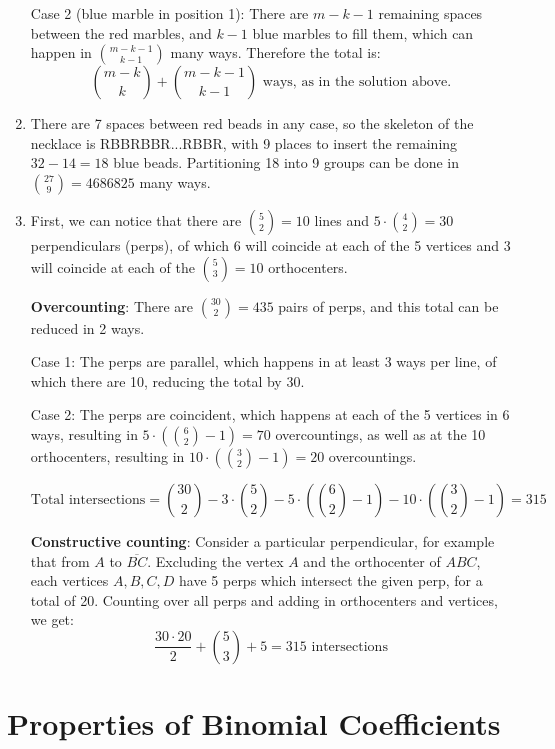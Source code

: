 \documentclass{book}
\numberwithin{equation}{section}
\begin{document}
\begin{enumerate}[label={2.\arabic*}]
Case 2 (blue marble in position 1): There are $m-k-1$ remaining spaces
between the red marbles, and $k-1$ blue marbles to fill them, which can
happen in ${m-k-1 \choose k-1}$ many ways. Therefore the total is:
$${m-k \choose k} + {m-k-1 \choose k-1} \text{ ways, as in the solution
above.}$$

\item
There are 7 spaces between red beads in any case, so the skeleton of the
necklace is RBBRBBR...RBBR, with 9 places to insert the remaining $32-14=18$
blue beads. Partitioning 18 into 9 groups can be done in
${27 \choose 9} = 4686825$ many ways.

\item
First, we can notice that there are ${5 \choose 2} = 10$ lines and 
$5 \cdot {4 \choose 2} = 30$ perpendiculars
(perps), of which 6 will coincide at each of the 5 vertices and 3 will coincide
at each of the ${5 \choose 3} = 10$ orthocenters.

\textbf{Overcounting}: There are ${30 \choose 2} = 435$ pairs of perps, and
this total can be reduced in 2 ways.

Case 1: The perps are parallel, which happens in at least 3 ways per line,
of which there are 10, reducing the total by 30.

Case 2: The perps are coincident, which happens at each of the 5 vertices in
6 ways, resulting in $5 \cdot ({6 \choose 2} - 1) = 70$ overcountings, as 
well as at the 10 orthocenters, resulting in $10 \cdot ({3 \choose 2} - 1) = 20$
overcountings.

$$\text{Total intersections} = {30 \choose 2} - 3 \cdot {5 \choose 2} - 
5 \cdot ({6 \choose 2} - 1) - 10 \cdot ({3 \choose 2} - 1) = 315$$

\textbf{Constructive counting}: Consider a particular perpendicular, for
example that from $A$ to $\overline{BC}$. Excluding the vertex $A$ and the
orthocenter of $ABC$, each vertices $A, B, C, D$ have 5 perps which
intersect the given perp, for a total of 20. Counting over all perps and
adding in orthocenters and vertices, we get:
$$\frac{30 \cdot 20}{2} + {5 \choose 3} + 5 = 315 \text{ intersections}$$

\end{enumerate}

\chapter{Properties of Binomial Coefficients}
\end{document}
